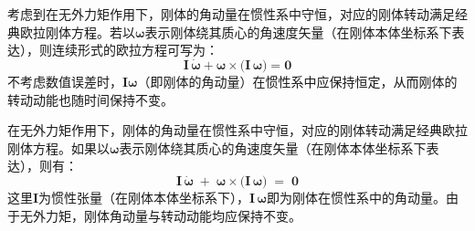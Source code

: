 考虑到在无外力矩作用下，刚体的角动量在惯性系中守恒，对应的刚体转动满足经典欧拉刚体方程。若以$\boldsymbol{\omega}$表示刚体绕其质心的角速度矢量（在刚体本体坐标系下表达），则连续形式的欧拉方程可写为：
\begin{equation}\label{eq:euler}
	\mathbf{I}\,\dot{\boldsymbol{\omega}} + \boldsymbol{\omega} \times \bigl(\mathbf{I}\,\boldsymbol{\omega}\bigr) = \mathbf{0}
\end{equation}
不考虑数值误差时，$\mathbf{I}\boldsymbol{\omega}$（即刚体的角动量）在惯性系中应保持恒定，从而刚体的转动动能也随时间保持不变。


在无外力矩作用下，刚体的角动量在惯性系中守恒，对应的刚体转动满足经典欧拉刚体方程。如果以$\boldsymbol{\omega}$表示刚体绕其质心的角速度矢量（在刚体本体坐标系下表达），则有：
\begin{equation}\label{eq:euler}
	\mathbf{I}\,\dot{\boldsymbol{\omega}}
	\;+\;
	\boldsymbol{\omega} \times \bigl(\mathbf{I}\,\boldsymbol{\omega}\bigr)
	\;=\;
	\mathbf{0}
\end{equation}
这里$\mathbf{I}$为惯性张量（在刚体本体坐标系下），$\mathbf{I}\,\boldsymbol{\omega}$即为刚体在惯性系中的角动量。由于无外力矩，刚体角动量与转动动能均应保持不变。

